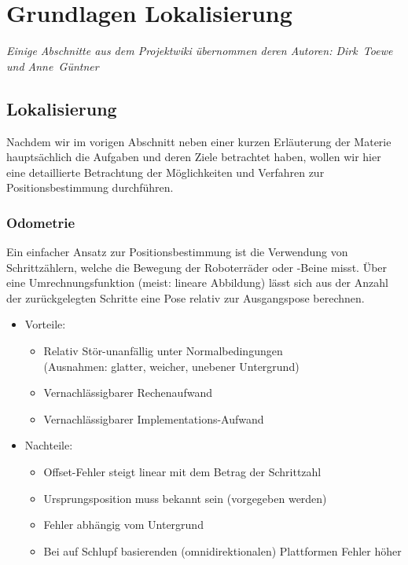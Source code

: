 \section{Grundlagen Lokalisierung}
\label{lokalisierung_grundlagen_sec}
\authorsection{\editorandreas}
\begin{flushright}\textit{Einige Abschnitte aus dem Projektwiki übernommen deren
Autoren: Dirk~Toewe und Anne~Güntner}\end{flushright}
\subsection{Lokalisierung}
Nachdem wir im vorigen Abschnitt neben einer kurzen Erläuterung der
Materie hauptsächlich die Aufgaben und deren Ziele betrachtet haben,
 wollen wir hier eine detaillierte Betrachtung der Möglichkeiten
 und Verfahren zur Positionsbestimmung durchführen.
 
\subsubsection{Odometrie}
Ein einfacher Ansatz zur Positionsbestimmung ist die Verwendung
 von Schrittzählern, welche die Bewegung der Roboterräder oder
 -Beine misst. Über eine Umrechnungsfunktion (meist: lineare
 Abbildung) lässt sich aus der Anzahl der zurückgelegten Schritte
 eine Pose relativ zur Ausgangspose berechnen.

\begin{itemize}
  \item Vorteile:
  \begin{itemize}
    \item Relativ Stör-unanfällig unter Normalbedingungen\\ 
    (Ausnahmen: glatter, weicher, unebener Untergrund)
    \item Vernachlässigbarer Rechenaufwand
    \item Vernachlässigbarer Implementations-Aufwand
  \end{itemize}
  \item Nachteile:
  \begin{itemize}
    \item Offset-Fehler steigt linear mit dem Betrag der Schrittzahl
    \item Ursprungsposition muss bekannt sein (vorgegeben werden)
    \item Fehler abhängig vom Untergrund
    \item Bei auf Schlupf basierenden (omnidirektionalen)
     Plattformen Fehler höher
   \end{itemize}
\end{itemize}

